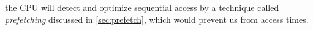 \begin{comment}
   We will see why this measurement was conducted with random instead of sequential
   accesses in \cref{sec:prefetch}.

   \Cref{sec:prefetch} \alts{explains, will explain} the reason for \x{going through the
   trouble of} \alts{using, conducting} random accesses instead of just reading the array
   sequentially\x{for this measurement}.
\end{comment}
the CPU will detect and optimize sequential access by a technique called
\emph{prefetching} discussed in \cref{sec:prefetch}, which would prevent us from
 access times.

%
\begin{comment}
   \begin{figure}
      \inputminted[firstline=9]{c}{access-times/access-times.c}%
      \captionof{listing}{TODO}
      \label{lst:access-times}
   \end{figure}
\end{comment}



%
\begin{center} %
   \inputminted[firstline=12]{c}{access-times/access-times.c}%
   \label{lst:access-times}
\end{center}

